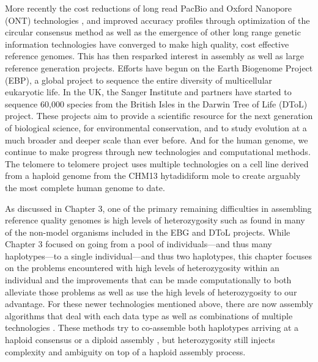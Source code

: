 \par{
More recently the cost reductions of long read PacBio and Oxford Nanopore (ONT) technologies \cite{pacbio} \cite{oxford}, and improved accuracy profiles through optimization of the circular consensus method \cite{ccs}\cite{HIFI}
as well as the emergence of other long range genetic information technologies \cite{10xlinked} \cite{HiC} \cite{bionano} 
have converged to make high quality, cost effective reference genomes. This has then resparked interest in assembly 
as well as large reference generation projects. Efforts have begun on the Earth Biogenome Project (EBP)\cite{EBGP}, a global project to sequence the entire diversity of multicellular eukaryotic life. In the UK, the Sanger Institute and partners have started to sequence 60,000 species from the British Isles in the Darwin Tree of Life (DToL) project. These projects aim to provide a scientific resource for the next generation of biological science, for environmental conservation, and to study evolution at a much broader and deeper scale than ever before. And for the human genome, we continue to make progress through new technologies and computational methods\cite{Wenger2019}\cite{tobias1}\cite{eichler1}. The telomere to telomere project uses multiple technologies on a cell line derived from a haploid genome from the CHM13 hytadidiform mole to create arguably the most complete human genome to date\cite{T2T2}\cite{T2T1}.
} 

\par{
As discussed in Chapter 3, one of the primary remaining difficulties in assembling reference quality genomes is high levels of heterozygosity such as found in many of the non-model organisms included in the EBG and DToL projects. While Chapter 3 focused on going from a pool of individuals---and thus many haplotypes---to a single individual---and thus two haplotypes, this chapter focuses on the problems encountered with high levels of heterozygosity within an individual and the improvements that can be made computationally to both alleviate those problems as well as use the high levels of heterozygosity to our advantage. 
For these newer technologies mentioned above, there are now assembly algorithms that deal with each data type \cite{falcon} \cite{supernova} \cite{bionano_assembly} 
as well as combinations of multiple technologies \cite{genemyers} \cite{hybrid10x} \cite{hicscafffirst}\cite{hicassembly}. 
 These methods try to co-assemble both haplotypes arriving at a haploid consensus \cite{watchtower} \cite{canu} 
 or a diploid assembly \cite{falconphase} \cite{supernova} \cite{hifiasm}\cite{dipasm}, but heterozygosity still injects complexity and ambiguity on top of a haploid assembly process.
} 


